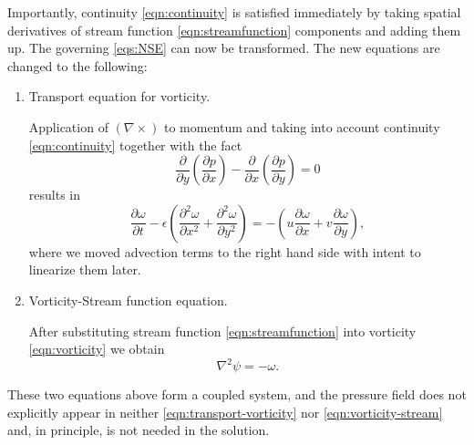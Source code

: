 \documentclass{article}
\numberwithin{equation}{section}
\begin{document}
	Importantly, continuity \cref{eqn:continuity} is satisfied immediately by taking spatial derivatives of stream function \cref{eqn:streamfunction} components and adding them up. The governing \cref{eqs:NSE} can now be transformed. The new equations are changed to the following:
	\begin{enumerate}
		\item 
			Transport equation for vorticity.
			
			Application of $(\nabla \times)$ to momentum and taking into account continuity \cref{eqn:continuity} together with the fact
			\begin{equation}
				\frac{\partial}{\partial y}\left(\frac{\partial p}{\partial x}\right) - 
				\frac{\partial}{\partial x}\left(\frac{\partial p}{\partial y}\right)=0
			\end{equation}
			results in
			\begin{equation}
			\label{eqn:transport-vorticity}
				\boxed{
				\frac{\partial\omega}{\partial t} -\epsilon \left(\frac{\partial ^2 \omega}{\partial x^2} 
				+ \frac{\partial^2 \omega}{\partial y^2} \right)
				=-\left( u \frac{\partial\omega}{\partial x} 
				+ v\frac{\partial\omega}{\partial y}\right),
				}
			\end{equation}
			where we moved advection terms to the right hand side with intent to linearize them later.
		\item 
		Vorticity-Stream function equation.
		
		After substituting stream function \cref{eqn:streamfunction} into vorticity \cref{eqn:vorticity} we obtain
		\begin{equation}
			\label{eqn:vorticity-stream}
			\boxed{\nabla ^2 \psi = -\omega.}
		\end{equation}	
	\end{enumerate}
	
	These two equations above form a coupled system, and the pressure field does not explicitly appear in neither \cref{eqn:transport-vorticity} nor \cref{eqn:vorticity-stream} and, in principle, is not needed in the solution.
	
\end{document}
